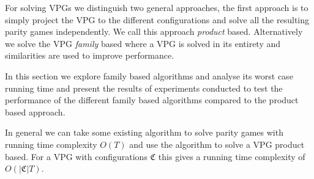 For solving VPGs we distinguish two general approaches, the first approach is to simply project the VPG to the different configurations and solve all the resulting parity games independently. We call this approach \textit{product} based. Alternatively we solve the VPG \textit{family} based where a VPG is solved in its entirety and similarities are used to improve performance. 

In this section we explore family based algorithms and analyse its worst case running time and present the results of experiments conducted to test the performance of the different family based algorithms compared to the product based approach.

In general we can take some existing algorithm to solve parity games with running time complexity $O(T)$ and use the algorithm to solve a VPG product based. For a VPG with configurations $\mathfrak{C}$ this gives a running time complexity of $O(|\mathfrak{C}|T)$.